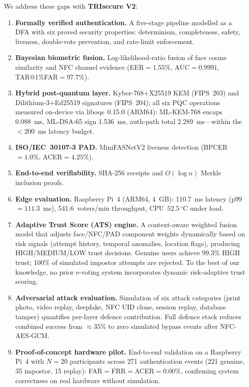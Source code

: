 \documentclass[pdflatex,sn-mathphys-num]{sn-jnl}%
\theoremstyle{thmstyleone}%
\theoremstyle{thmstyletwo}%
\theoremstyle{thmstylethree}%
\begin{document}
We address these gaps with \textbf{TRIsecure V2}:

\begin{enumerate}[label=\textbf{C\arabic*.},leftmargin=*]
  \item \textbf{Formally verified authentication.} A five-stage pipeline
        modelled as a DFA with six proved security properties: determinism,
        completeness, safety, liveness, double-vote prevention, and
        rate-limit enforcement.
  \item \textbf{Bayesian biometric fusion.} Log-likelihood-ratio fusion of
        face cosine similarity and NFC channel evidence
        (EER\(=1.55\%\), AUC\(=0.9991\), TAR@1\%FAR\(=97.7\%\)).
  \item \textbf{Hybrid post-quantum layer.} Kyber-768\(+\)X25519 KEM
        (FIPS~203) and Dilithium-3\(+\)Ed25519 signatures (FIPS~204); all
        six PQC operations measured on-device via liboqs~0.15.0 (ARM64):
        ML-KEM-768 encaps 0.088~ms, ML-DSA-65 sign 1.536~ms, auth-path
        total 2.289~ms---within the \(<200\)~ms latency budget.
  \item \textbf{ISO/IEC~30107-3 PAD.} MiniFASNetV2 liveness detection
        (BPCER\(=1.0\%\), ACER\(=4.25\%\)).
  \item \textbf{End-to-end verifiability.} SHA-256 receipts and \(O(\log n)\)
        Merkle inclusion proofs.
  \item \textbf{Edge evaluation.} Raspberry Pi~4 (ARM64, 4~GB): 110.7~ms
        latency (p99\(=111.3\)~ms), 541.6~voters/min throughput,
        CPU~\(52.5\,^\circ\)C under load.
  \item \textbf{Adaptive Trust Score (ATS) engine.} A context-aware
        weighted fusion model that adjusts face/NFC/PAD component weights
        dynamically based on risk signals (attempt history, temporal
        anomalies, location flags), producing HIGH/MEDIUM/LOW trust
        decisions. Genuine users achieve 99.3\% HIGH trust; 100\% of
        simulated impostor attempts are rejected. To the best of our
        knowledge, no prior e-voting system incorporates dynamic
        risk-adaptive trust scoring.
  \item \textbf{Adversarial attack evaluation.} Simulation of six attack
        categories (print photo, video replay, deepfake, NFC UID clone,
        session replay, database tamper) quantifies per-layer defence
        contribution. Full defence stack reduces combined success from
        \(\approx35\%\) to zero simulated bypass events after NFC-AES-GCM.
  \item \textbf{Proof-of-concept hardware pilot.} End-to-end validation on
        a Raspberry Pi~4 with \(N{=}20\) participants across 271
        authentication events (221 genuine, 35 impostor, 15 replay):
        FAR\(=\)FRR\(=\)ACER\(=0.00\%\), confirming system correctness on
        real hardware without simulation.
\end{enumerate}
\end{document}
